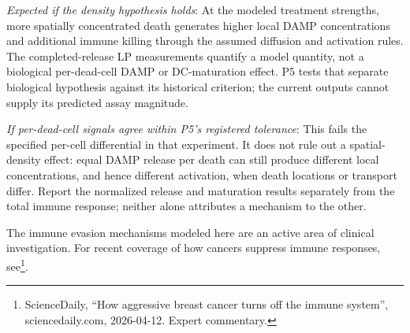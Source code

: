 \documentclass[11pt,twoside,openright]{report}
\begin{document}
\textit{Expected if the density hypothesis holds}: At the modeled treatment strengths, more spatially concentrated death generates higher local DAMP concentrations and additional immune killing through the assumed diffusion and activation rules. The completed-release LP measurements quantify a model quantity, not a biological per-dead-cell DAMP or DC-maturation effect. P5 tests that separate biological hypothesis against its historical criterion; the current outputs cannot supply its predicted assay magnitude.

\textit{If per-dead-cell signals agree within P5's registered tolerance}: This fails the specified per-cell differential in that experiment. It does not rule out a spatial-density effect: equal DAMP release per death can still produce different local concentrations, and hence different activation, when death locations or transport differ. Report the normalized release and maturation results separately from the total immune response; neither alone attributes a mechanism to the other.

The immune evasion mechanisms modeled here are an active area of clinical investigation. For recent coverage of how cancers suppress immune responses, see\footnote{ScienceDaily, ``How aggressive breast cancer turns off the immune system'', sciencedaily.com, 2026-04-12. Expert commentary.}.
\end{document}
